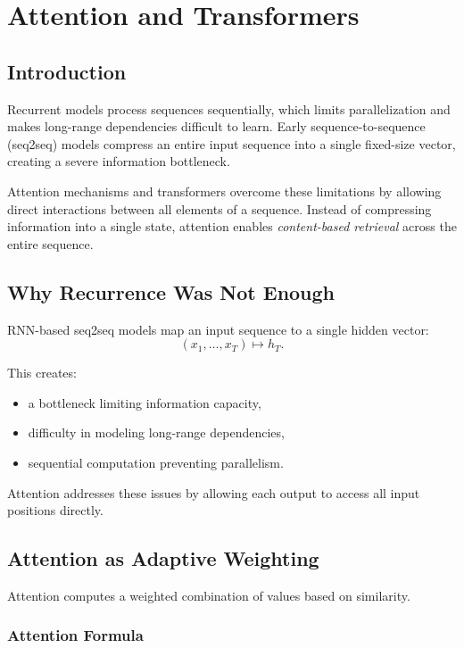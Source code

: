 \chapter{Attention and Transformers}

\section{Introduction}

Recurrent models process sequences sequentially, which limits parallelization and makes long-range dependencies difficult to learn. Early sequence-to-sequence (seq2seq) models compress an entire input sequence into a single fixed-size vector, creating a severe information bottleneck.

Attention mechanisms and transformers overcome these limitations by allowing direct interactions between all elements of a sequence. Instead of compressing information into a single state, attention enables \emph{content-based retrieval} across the entire sequence.

\section{Why Recurrence Was Not Enough}

RNN-based seq2seq models map an input sequence to a single hidden vector:
\[
(x_1,\dots,x_T) \mapsto h_T.
\]

This creates:
\begin{itemize}
    \item a bottleneck limiting information capacity,
    \item difficulty in modeling long-range dependencies,
    \item sequential computation preventing parallelism.
\end{itemize}

Attention addresses these issues by allowing each output to access all input positions directly.

\section{Attention as Adaptive Weighting}

Attention computes a weighted combination of values based on similarity.

\subsection{Attention Formula}

